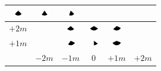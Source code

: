 \begin{tabular}{|c|c|c|c|c|c|}
	\includegraphics[width=0.5cm]{img_Bereich/V1_img_Winkel_X_0_3000.png} &
	\includegraphics[width=0.5cm]{img_Bereich/V1_img_Winkel_X_1000_3000.png} &
	\includegraphics[width=0.5cm]{img_Bereich/V1_img_Winkel_X_2000_3000.png} \\ 
	\hline 
	$+2m$ &&
	\includegraphics[width=0.5cm]{img_Bereich/V1_img_Winkel_X_-1000_2000.png} &
	\includegraphics[width=0.5cm]{img_Bereich/V1_img_Winkel_X_0_2000.png} &
	\includegraphics[width=0.5cm]{img_Bereich/V1_img_Winkel_X_1000_2000.png} & \\ 
	\hline 
	$+1m$ & &
	\includegraphics[width=0.5cm]{img_Bereich/V1_img_Winkel_X_-1000_1000.png} &
	\includegraphics[width=0.5cm]{img_Bereich/V1_img_Winkel_X_0_1000.png} &
	\includegraphics[width=0.5cm]{img_Bereich/V1_img_Winkel_X_1000_1000.png} & \\ 
	\hline 
	& $-2m$ & $-1m$ &0& $+1m$ & $+2m$ \\ 
	\hline 
\end{tabular}